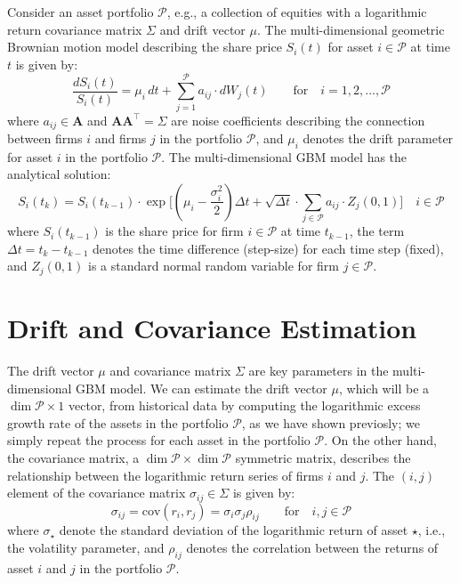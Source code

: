 \documentclass[11pt]{article}
\theoremstyle{definition}
\begin{document}
Consider an asset portfolio $\mathcal{P}$, e.g., a collection of equities with a logarithmic return covariance matrix $\Sigma$ and drift vector $\mu$.
The multi-dimensional geometric Brownian motion model describing the share price $S_{i}(t)$ for asset $i\in\mathcal{P}$ at time $t$ is given by: 
\begin{equation*}
\frac{dS_{i}\left(t\right)}{S_{i}(t)} = \mu_{i}\,{dt}+\sum_{j=1}^{\mathcal{P}}a_{ij}\cdot{dW_{j}(t)}\qquad\text{for}\quad{i=1,2,\dots,\mathcal{P}}
\end{equation*}
where $a_{ij}\in\mathbf{A}$ and $\mathbf{A}\mathbf{A}^{\top} = \Sigma$ are noise coefficients describing the connection between firms $i$ and firms $j$ in the portfolio $\mathcal{P}$,
and $\mu_{i}$ denotes the drift parameter for asset $i$ in the portfolio $\mathcal{P}$.
The multi-dimensional GBM model has the analytical solution:
\begin{equation*}
S_{i}(t_{k}) = S_{i}(t_{k-1})\cdot\exp\Biggl[\left(\mu_{i}-\frac{\sigma_{i}^{2}}{2}\right)\Delta{t} + \sqrt{\Delta{t}}\cdot\sum_{j\in\mathcal{P}}a_{ij}\cdot{Z_{j}(0,1)}\Biggr]\quad{i\in\mathcal{P}}
\end{equation*}
where $S_{i}(t_{k-1})$ is the share price for firm $i\in\mathcal{P}$ at time $t_{k-1}$,  the term $\Delta{t} = t_{k} - t_{k-1}$ denotes the time difference (step-size) 
for each time step (fixed), and $Z_{j}(0,1)$ is a standard normal random variable for firm $j\in\mathcal{P}$.

\section*{Drift and Covariance Estimation}
The drift vector $\mu$ and covariance matrix $\Sigma$ are key parameters in the multi-dimensional GBM model.
We can estimate the drift vector $\mu$, which will be a $\dim\mathcal{P}\times{1}$ vector, from historical data by computing the logarithmic excess growth rate of the assets in the portfolio $\mathcal{P}$, 
as we have shown previosly; we simply repeat the process for each asset in the portfolio $\mathcal{P}$.
On the other hand, the covariance matrix, a $\dim\mathcal{P}\times\dim\mathcal{P}$ symmetric matrix, describes the relationship between the logarithmic return series of firms $i$ and $j$.
The $(i,j)$ element of the covariance matrix $\sigma_{ij}\in\Sigma$ is given by:
\begin{equation*}
    \sigma_{ij} = \text{cov}\left(r_{i},r_{j}\right) = \sigma_{i}\sigma_{j}\rho_{ij}\qquad\text{for}\quad{i,j \in \mathcal{P}}
\end{equation*}
where $\sigma_{\star}$ denote the standard deviation of the logarithmic return of asset $\star$, i.e., the volatility parameter, and $\rho_{ij}$ 
denotes the correlation between the returns of asset $i$ and $j$ in the portfolio $\mathcal{P}$. 
\end{document}
